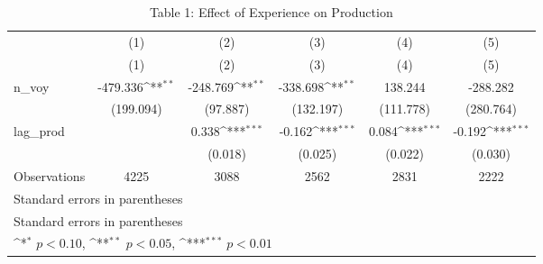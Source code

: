 \begin{table}[htbp]\centering
\def\sym#1{\ifmmode^{#1}\else\(^{#1}\)\fi}
\caption{Table 1: Effect of Experience on Production}
\begin{tabular}{l*{5}{c}}
\hline\hline
                    &\multicolumn{1}{c}{(1)}&\multicolumn{1}{c}{(2)}&\multicolumn{1}{c}{(3)}&\multicolumn{1}{c}{(4)}&\multicolumn{1}{c}{(5)}\\
                    &\multicolumn{1}{c}{(1)}&\multicolumn{1}{c}{(2)}&\multicolumn{1}{c}{(3)}&\multicolumn{1}{c}{(4)}&\multicolumn{1}{c}{(5)}\\
\hline
n\_voy               &    -479.336\sym{**} &    -248.769\sym{**} &    -338.698\sym{**} &     138.244         &    -288.282         \\
                    &   (199.094)         &    (97.887)         &   (132.197)         &   (111.778)         &   (280.764)         \\
lag\_prod            &                     &       0.338\sym{***}&      -0.162\sym{***}&       0.084\sym{***}&      -0.192\sym{***}\\
                    &                     &     (0.018)         &     (0.025)         &     (0.022)         &     (0.030)         \\
\hline
Observations        &        4225         &        3088         &        2562         &        2831         &        2222         \\
\hline\hline
\multicolumn{6}{l}{\footnotesize Standard errors in parentheses}\\
\multicolumn{6}{l}{\footnotesize Standard errors in parentheses}\\
\multicolumn{6}{l}{\footnotesize \sym{*} \(p<0.10\), \sym{**} \(p<0.05\), \sym{***} \(p<0.01\)}\\
\end{tabular}
\end{table}
